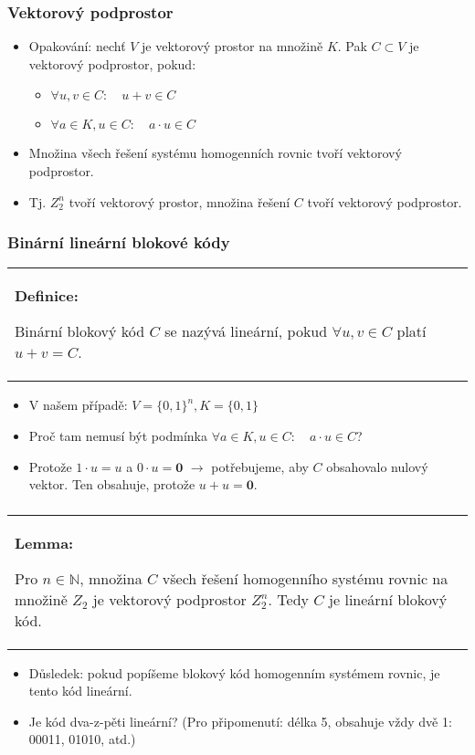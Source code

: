 \documentclass{beamer}
\newenvironment{definice}
{
    \begin{center}
    \begin{tabular}{p{9cm}}
    \textbf{Definice:}
}
{
    \end{tabular}
    \end{center}
}
\newenvironment{lema}
{
    \begin{center}
    \begin{tabular}{p{9cm}}
    \textbf{Lemma:}
}
{
    \end{tabular}
    \end{center}
}
\newenvironment{itemizex}%
  {\large \begin{itemize}%
    \setlength{\itemsep}{8pt}%
    \setlength{\parskip}{8pt}}%
  {\end{itemize}}
\begin{document}
\begin{frame}[t,fragile]\frametitle{Vektorový podprostor} 
    \begin{itemizex}
        \item Opakování: nechť $V$ je vektorový prostor na množině $K$. Pak $C\subset V$ je vektorový podprostor, pokud:
      \begin{itemizex}
        \item $\forall u,v \in C:\quad u+v\in C$
        \item $\forall a\in K, u \in C:\quad a\cdot u\in C$
      \end{itemizex}
      \item Množina všech řešení systému homogenních rovnic tvoří vektorový podprostor.
      \item Tj. $Z_2^n$ tvoří vektorový prostor, množina řešení $C$ tvoří vektorový podprostor.
    \end{itemizex}
\end{frame}



\begin{frame}[t,fragile]\frametitle{Binární lineární blokové kódy} 
    \begin{definice}
Binární blokový kód $C$ se nazývá lineární, pokud $\forall u,v\in C$ platí $u+v=C$.
    \end{definice}

    \begin{itemizex}
      
      \item V našem případě: $V=\{0,1\}^n, K=\{0,1\}$
      \item Proč tam nemusí být podmínka $\forall a\in K, u \in C:\quad a\cdot u\in C$?
      \item Protože $1\cdot u = u$ a $0\cdot u = \textbf{0}$ $\longrightarrow$ potřebujeme, aby $C$ obsahovalo nulový vektor. Ten obsahuje, protože $u+u=\textbf{0}$.
    \end{itemizex}
\end{frame}


\begin{frame}[t,fragile]\frametitle{} 
  \begin{lema}
    Pro $n\in\mathbb{N}$, množina $C$ všech řešení homogenního systému rovnic na množině $Z_2$ je vektorový podprostor $Z_2^n$. Tedy $C$ je lineární blokový kód.
  \end{lema}

  \begin{itemizex}
    \item Důsledek: pokud popíšeme blokový kód homogenním systémem rovnic, je tento kód lineární.
    \item Je kód dva-z-pěti lineární? (Pro připomenutí: délka 5, obsahuje vždy dvě 1: 00011, 01010, atd.)
  \end{itemizex}
\end{frame}
\end{document}

